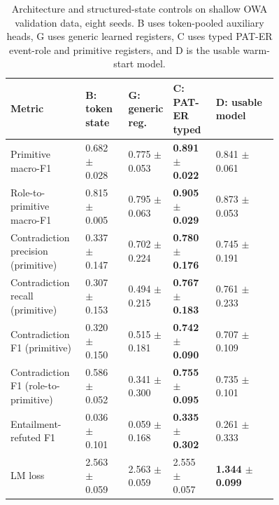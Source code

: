 \begin{table}[H]
\caption{Architecture and structured-state controls on shallow OWA validation data, eight seeds. B uses token-pooled auxiliary heads, G uses generic learned registers, C uses typed PAT-ER event-role and primitive registers, and D is the usable warm-start model.\label{tab:architecture_matrix}}
\footnotesize
\begin{tabularx}{\textwidth}{@{}p{0.28\linewidth}p{0.16\linewidth}p{0.16\linewidth}p{0.16\linewidth}X@{}}
\toprule
\textbf{Metric} & \textbf{B: token state} & \textbf{G: generic reg.} & \textbf{C: PAT-ER typed} & \textbf{D: usable model} \\
\midrule
Primitive macro-F1 & 0.682 $\pm$ 0.028 & 0.775 $\pm$ 0.053 & \textbf{0.891 $\pm$ 0.022} & 0.841 $\pm$ 0.061 \\
Role-to-primitive macro-F1 & 0.815 $\pm$ 0.005 & 0.795 $\pm$ 0.063 & \textbf{0.905 $\pm$ 0.029} & 0.873 $\pm$ 0.053 \\
Contradiction precision (primitive) & 0.337 $\pm$ 0.147 & 0.702 $\pm$ 0.224 & \textbf{0.780 $\pm$ 0.176} & 0.745 $\pm$ 0.191 \\
Contradiction recall (primitive) & 0.307 $\pm$ 0.153 & 0.494 $\pm$ 0.215 & \textbf{0.767 $\pm$ 0.183} & 0.761 $\pm$ 0.233 \\
Contradiction F1 (primitive) & 0.320 $\pm$ 0.150 & 0.515 $\pm$ 0.181 & \textbf{0.742 $\pm$ 0.090} & 0.707 $\pm$ 0.109 \\
Contradiction F1 (role-to-primitive) & 0.586 $\pm$ 0.052 & 0.341 $\pm$ 0.300 & \textbf{0.755 $\pm$ 0.095} & 0.735 $\pm$ 0.101 \\
Entailment-refuted F1 & 0.036 $\pm$ 0.101 & 0.059 $\pm$ 0.168 & \textbf{0.335 $\pm$ 0.302} & 0.261 $\pm$ 0.333 \\
LM loss & 2.563 $\pm$ 0.059 & 2.563 $\pm$ 0.059 & 2.555 $\pm$ 0.057 & \textbf{1.344 $\pm$ 0.099} \\
\bottomrule
\end{tabularx}
\end{table}


